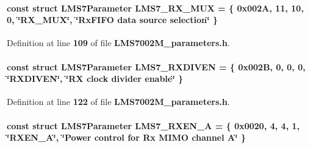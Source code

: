 \paragraph[{L\+M\+S7\+\_\+\+R\+X\+\_\+\+M\+UX}]{\setlength{\rightskip}{0pt plus 5cm}const struct {\bf L\+M\+S7\+Parameter} L\+M\+S7\+\_\+\+R\+X\+\_\+\+M\+UX = \{ 0x002\+A, 11, 10, 0, \char`\"{}\+R\+X\+\_\+\+M\+U\+X\char`\"{}, \char`\"{}\+Rx\+F\+I\+F\+O data source selection\char`\"{} \}\hspace{0.3cm}{\ttfamily [static]}}\label{LMS7002M__parameters_8h_a38f5abc381cd0d600901b28bf5810e1f}


Definition at line {\bf 109} of file {\bf L\+M\+S7002\+M\+\_\+parameters.\+h}.

\paragraph[{L\+M\+S7\+\_\+\+R\+X\+D\+I\+V\+EN}]{\setlength{\rightskip}{0pt plus 5cm}const struct {\bf L\+M\+S7\+Parameter} L\+M\+S7\+\_\+\+R\+X\+D\+I\+V\+EN = \{ 0x002\+B, 0, 0, 0, \char`\"{}\+R\+X\+D\+I\+V\+E\+N\char`\"{}, \char`\"{}\+R\+X clock divider enable\char`\"{} \}\hspace{0.3cm}{\ttfamily [static]}}\label{LMS7002M__parameters_8h_a20392b39a4291dddd8bad1f6aa3bf453}


Definition at line {\bf 122} of file {\bf L\+M\+S7002\+M\+\_\+parameters.\+h}.

\paragraph[{L\+M\+S7\+\_\+\+R\+X\+E\+N\+\_\+A}]{\setlength{\rightskip}{0pt plus 5cm}const struct {\bf L\+M\+S7\+Parameter} L\+M\+S7\+\_\+\+R\+X\+E\+N\+\_\+A = \{ 0x0020, 4, 4, 1, \char`\"{}\+R\+X\+E\+N\+\_\+\+A\char`\"{}, \char`\"{}\+Power control for Rx M\+I\+M\+O channel A\char`\"{} \}\hspace{0.3cm}{\ttfamily [static]}}\label{LMS7002M__parameters_8h_aabd2bfff9520ad2bdaf446ec7a1b8c32}


